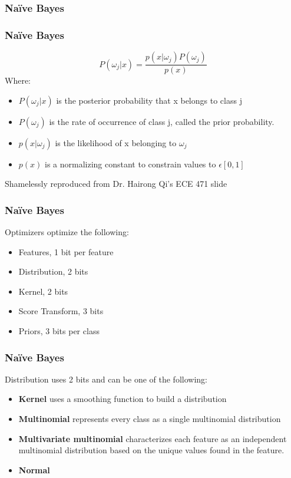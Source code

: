 \documentclass{beamer}
\begin{document}
\subsubsection{Na\"ive Bayes}
\begin{frame}
	\frametitle{Na\"ive Bayes}
	\begin{equation*}
	P(\omega_j|x) = \frac{p(x|\omega_j)P(\omega_j)}{p(x)}
		\end{equation*}
	Where: \begin{itemize}
		\item $P(\omega_j|x)$ is the posterior probability that x belongs to class j
		\item $P(\omega_j)$ is the rate of occurrence of class j, called the prior probability.
		\item $p(x|\omega_j)$ is the likelihood of x belonging to $\omega_j$
		\item $p(x)$ is a normalizing constant to constrain values to $\epsilon[0,1]$
	\end{itemize}
	\vspace{2cm}
	
	\tiny{Shamelessly reproduced from Dr. Hairong Qi's ECE 471 slide}
\end{frame}
\begin{frame}
		\frametitle{Na\"ive Bayes}
		Optimizers optimize the following: 
		\begin{itemize}
			\item Features, 1 bit per feature
			\item Distribution, 2 bits
			\item Kernel, 2 bits
			\item Score Transform, 3 bits
			\item Priors, 3 bits per class
		\end{itemize}
\end{frame}

\begin{frame}
	\frametitle{Na\"ive Bayes}
	Distribution uses 2 bits and can be one of the following: 
	\begin{itemize}
	\item \textbf{Kernel} uses a smoothing function to build a distribution
	\item	\textbf{Multinomial} represents every class as a single multinomial distribution
	\item	\textbf{Multivariate multinomial} characterizes each feature as an independent multinomial distribution based on the unique values found in the feature.
	\item	\textbf{Normal}
	\end{itemize}
\end{frame}
\end{document}
